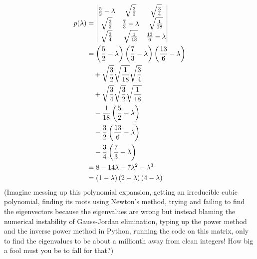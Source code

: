 \item

\begin{align*}
    p(\lambda)
    &= \begin{vmatrix}
        \frac{5}{2} - \lambda & \sqrt{\frac{3}{2}} & \sqrt{\frac{3}{4}} \\
        \sqrt{\frac{3}{2}} & \frac{7}{3} - \lambda & \sqrt{\frac{1}{18}} \\
        \sqrt{\frac{3}{4}} & \sqrt{\frac{1}{18}} & \frac{13}{6} - \lambda
    \end{vmatrix} \\
    &= \left( \frac{5}{2} - \lambda \right)
       \left( \frac{7}{3} - \lambda \right)
       \left( \frac{13}{6} - \lambda \right) \\
    &\quad + \sqrt{\frac{3}{2}} \sqrt{\frac{1}{18}} \sqrt{\frac{3}{4}} \\
    &\quad + \sqrt{\frac{3}{4}} \sqrt{\frac{3}{2}} \sqrt{\frac{1}{18}} \\
    &\quad - \frac{1}{18} \left( \frac{5}{2} - \lambda \right) \\
    &\quad - \frac{3}{2} \left( \frac{13}{6} - \lambda \right) \\
    &\quad - \frac{3}{4} \left( \frac{7}{3} - \lambda \right) \\
    &= 8 - 14\lambda +7\lambda^2 - \lambda^3 \\
    &= \left( 1 - \lambda \right)
       \left( 2 - \lambda \right)
       \left( 4 - \lambda \right)
\end{align*}
(Imagine messing up this polynomial expansion,
getting an irreducible cubic polynomial,
finding its roots using Newton's method,
trying and failing to find the eigenvectors because the eigenvalues are wrong
but instead blaming the numerical instability of Gauss-Jordan elimination,
typing up the power method and the inverse power method in Python,
running the code on this matrix,
only to find the eigenvalues to be about a millionth away from clean integers!
How big a fool must you be to fall for that?)

